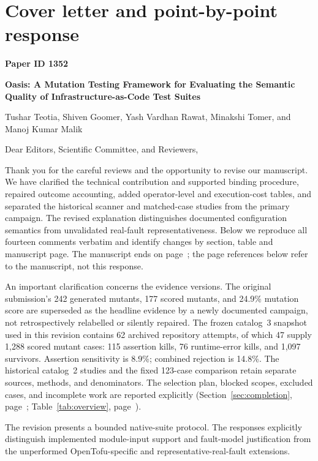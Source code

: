 \section*{Cover letter and point-by-point response}\label{sec:response}
\noindent\textbf{Paper ID 1352}\par
\noindent\textbf{Oasis: A Mutation Testing Framework for Evaluating the Semantic Quality of Infrastructure-as-Code Test Suites}\par
\noindent Tushar Teotia, Shiven Goomer, Yash Vardhan Rawat, Minakshi Tomer, and Manoj Kumar Malik\par
\medskip
\noindent Dear Editors, Scientific Committee, and Reviewers,

Thank you for the careful reviews and the opportunity to revise our manuscript. We have clarified the technical contribution and supported binding procedure, repaired outcome accounting, added operator-level and execution-cost tables, and separated the historical scanner and matched-case studies from the primary campaign. The revised explanation distinguishes documented configuration semantics from unvalidated real-fault representativeness. Below we reproduce all fourteen comments verbatim and identify changes by section, table and manuscript page. The manuscript ends on page~\pageref{lastmanuscriptpage}; the page references below refer to the manuscript, not this response.

An important clarification concerns the evidence versions. The original submission's 242 generated mutants, 177 scored mutants, and 24.9\% mutation score are superseded as the headline evidence by a newly documented campaign, not retrospectively relabelled or silently repaired. The frozen catalog~3 snapshot used in this revision contains 62 archived repository attempts, of which 47 supply 1,288 scored mutant cases: 115 assertion kills, 76 runtime-error kills, and 1,097 survivors. Assertion sensitivity is 8.9\%; combined rejection is 14.8\%. The historical catalog~2 studies and the fixed 123-case comparison retain separate sources, methods, and denominators. The selection plan, blocked scopes, excluded cases, and incomplete work are reported explicitly (Section~\ref{sec:completion}, page~\pageref{sec:completion}; Table~\ref{tab:overview}, page~\pageref{tab:overview}).

The revision presents a bounded native-suite protocol. The responses explicitly distinguish implemented module-input support and fault-model justification from the unperformed OpenTofu-specific and representative-real-fault extensions.


